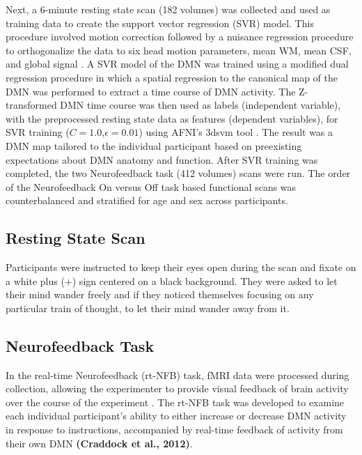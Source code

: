 Next, a 6-minute resting state scan (182 volumes) was collected and used as training data to create the support vector regression (SVR) model. This procedure involved motion correction followed by a nuisance regression procedure to orthogonalize the data to six head motion parameters, mean WM, mean CSF, and global signal \cite{Fox2005,Friston1996,Lund2006}. A SVR model of the DMN was trained using a modified dual regression procedure in which a spatial regression to the canonical map of the DMN was performed to extract a time course of DMN activity. The Z-transformed DMN time course was then used as labels (independent variable), with the preprocessed resting state data as features (dependent variables), for SVR training ($C=1.0$,$ \epsilon = 0.01$) using AFNI's 3dsvm tool \cite{Laconte2005}. The result was a DMN map tailored to the individual participant based on preexisting expectations about DMN anatomy and function. After SVR training was completed, the two Neurofeedback task (412 volumes) scans were run.  The order of the Neurofeedback On versus Off task based functional scans was counterbalanced and stratified for age and sex across participants.

\subsection{Resting State Scan}

Participants were instructed to keep their eyes open during the scan and fixate on a white plus ($+$) sign centered on a black background. They were asked to let their mind wander freely and if they noticed themselves focusing on any particular train of thought, to let their mind wander away from it.

\subsection{Neurofeedback Task}

In the real-time Neurofeedback (rt-NFB) task, fMRI data were processed during collection, allowing the experimenter to provide visual feedback of brain activity over the course of the experiment \cite{Cox1995,LaConte2011,McDonald2016}. The rt-NFB task was developed to examine each individual participant's ability to either increase or decrease DMN activity in response to instructions, accompanied by real-time feedback of activity from their own DMN \textbf{(Craddock et al., 2012)}.

